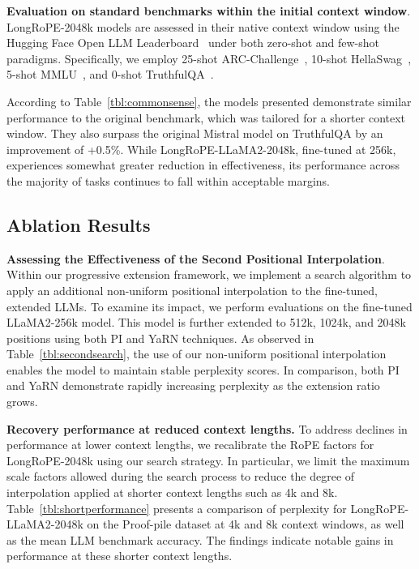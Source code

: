 \textbf{Evaluation on standard benchmarks within the initial context window}. LongRoPE-2048k models are assessed in their native context window using the Hugging Face Open LLM Leaderboard~\cite{huggingfaceboard} under both zero-shot and few-shot paradigms. Specifically, we employ 25-shot ARC-Challenge~\cite{allenai:arc}, 10-shot HellaSwag~\cite{zellers2019hellaswag}, 5-shot MMLU~\cite{mmlu}, and 0-shot TruthfulQA~\cite{lin2021truthfulqa}.

According to Table~\ref{tbl:commonsense}, the models presented demonstrate similar performance to the original benchmark, which was tailored for a shorter context window. They also surpass the original Mistral model on TruthfulQA by an improvement of +0.5\%. While LongRoPE-LLaMA2-2048k, fine-tuned at 256k, experiences somewhat greater reduction in effectiveness, its performance across the majority of tasks continues to fall within acceptable margins.

\subsection{Ablation Results}

\textbf{Assessing the Effectiveness of the Second Positional Interpolation}. Within our progressive extension framework, we implement a search algorithm to apply an additional non-uniform positional interpolation to the fine-tuned, extended LLMs. To examine its impact, we perform evaluations on the fine-tuned LLaMA2-256k model. This model is further extended to 512k, 1024k, and 2048k positions using both PI and YaRN techniques. As observed in Table~\ref{tbl:secondsearch}, the use of our non-uniform positional interpolation enables the model to maintain stable perplexity scores. In comparison, both PI and YaRN demonstrate rapidly increasing perplexity as the extension ratio grows.

\textbf{Recovery performance at reduced context lengths.} To address declines in performance at lower context lengths, we recalibrate the RoPE factors for LongRoPE-2048k using our search strategy. In particular, we limit the maximum scale factors allowed during the search process to reduce the degree of interpolation applied at shorter context lengths such as 4k and 8k. 
 Table~\ref{tbl:shortperformance} presents a comparison of perplexity for LongRoPE-LLaMA2-2048k on the Proof-pile dataset at 4k and 8k context windows, as well as the mean LLM benchmark accuracy. The findings indicate notable gains in performance at these shorter context lengths.

